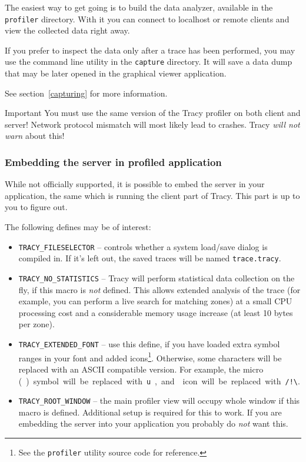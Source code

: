 \documentclass[hidelinks,titlepage,a4paper]{article}
\begin{document}
The easiest way to get going is to build the data analyzer, available in the \texttt{profiler} directory. With it you can connect to localhost or remote clients and view the collected data right away.

If you prefer to inspect the data only after a trace has been performed, you may use the command line utility in the \texttt{capture} directory. It will save a data dump that may be later opened in the graphical viewer application.

See section~\ref{capturing} for more information.

\begin{bclogo}[
noborder=true,
couleur=black!5,
logo=\bcbombe
]{Important}
You must use the same version of the Tracy profiler on both client and server! Network protocol mismatch will most likely lead to crashes. Tracy \emph{will not warn} about this!
\end{bclogo}

\subsubsection{Embedding the server in profiled application}
\label{embeddingserver}

While not officially supported, it is possible to embed the server in your application, the same which is running the client part of Tracy. This part is up to you to figure out.

The following defines may be of interest:

\begin{itemize}
\item \texttt{TRACY\_FILESELECTOR} -- controls whether a system load/save dialog is compiled in. If it's left out, the saved traces will be named \texttt{trace.tracy}.
\item \texttt{TRACY\_NO\_STATISTICS} -- Tracy will perform statistical data collection on the fly, if this macro is \emph{not} defined. This allows extended analysis of the trace (for example, you can perform a live search for matching zones) at a small CPU processing cost and a considerable memory usage increase (at least 10 bytes per zone).
\item \texttt{TRACY\_EXTENDED\_FONT} -- use this define, if you have loaded extra symbol ranges in your font and added icons\footnote{See the \texttt{profiler} utility source code for reference.}. Otherwise, some characters will be replaced with an ASCII compatible version. For example, the micro (\si\micro) symbol will be replaced with \texttt{u}, and \faWarning{} icon will be replaced with \texttt{/!\textbackslash}.
\item \texttt{TRACY\_ROOT\_WINDOW} -- the main profiler view will occupy whole window if this macro is defined. Additional setup is required for this to work. If you are embedding the server into your application you probably do \emph{not} want this.
\end{itemize}
\end{document}
